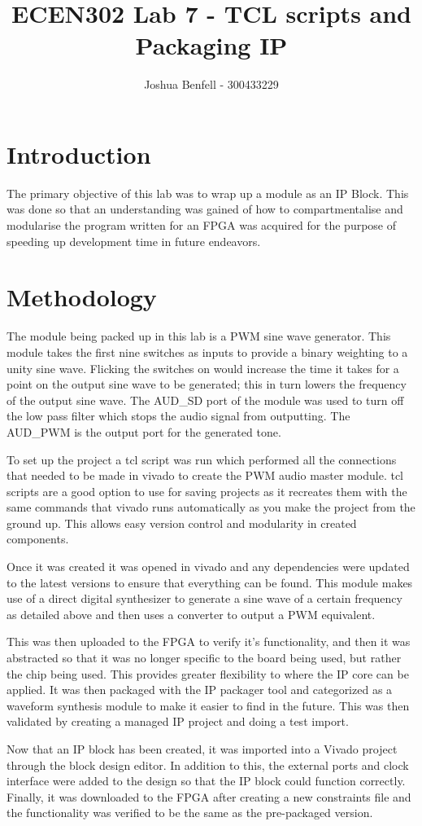 \documentclass[a4paper, 12pt]{article}
\title{ECEN302 Lab 7 - TCL scripts and Packaging IP}
\author{Joshua Benfell - 300433229}
\begin{document}
	\maketitle
	
	\section{Introduction}
		The primary objective of this lab was to wrap up a module as an IP Block. This was done so that an understanding was gained of how to compartmentalise and modularise the program written for an FPGA was acquired for the purpose of speeding up development time in future endeavors. 
	\section{Methodology}
		The module being packed up in this lab is a PWM sine wave generator. This module takes the first nine switches as inputs to provide a binary weighting to a unity sine wave. Flicking the switches on would increase the time it takes for a point on the output sine wave to be generated; this in turn lowers the frequency of the output sine wave. The AUD\_SD port of the module was used to turn off the low pass filter which stops the audio signal from outputting. The AUD\_PWM is the output port for the generated tone. 
		\par
		To set up the project a tcl script was run which performed all the connections that needed to be made in vivado to create the PWM audio master module. tcl scripts are a good option to use for saving projects as it recreates them with the same commands that vivado runs automatically as you make the project from the ground up. This allows easy version control and modularity in created components.
		\par
		Once it was created it was opened in vivado and any dependencies were updated to the latest versions to ensure that everything can be found. This module makes use of a direct digital synthesizer to generate a sine wave of a certain frequency as detailed above and then uses a converter to output a PWM equivalent.
		\par
		This was then uploaded to the FPGA to verify it's functionality, and then it was abstracted so that it was no longer specific to the board being used, but rather the chip being used. This provides greater flexibility to where the IP core can be applied. It was then packaged with the IP packager tool and categorized as a waveform synthesis module to make it easier to find in the future. This was then validated by creating a managed IP project and doing a test import.
		\par
		Now that an IP block has been created, it was imported into a Vivado project through the block design editor. In addition to this, the external ports and clock interface were added to the design so that the IP block could function correctly. Finally, it was downloaded to the FPGA after creating a new constraints file and the functionality was verified to be the same as the pre-packaged version.
		

\end{document}
